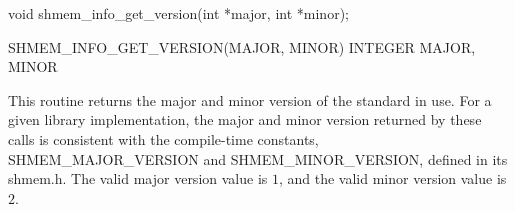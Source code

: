 \synC   %

void shmem_info_get_version(int *major, int *minor); %

\synF   %

SHMEM_INFO_GET_VERSION(MAJOR, MINOR)   
INTEGER MAJOR, MINOR %

{
  This routine returns the major and minor version of the \openshmem{} standard in use.
  For a given library implementation, the major and minor version returned by these calls is consistent with the compile-time constants, SHMEM\_MAJOR\_VERSION and SHMEM\_MINOR\_VERSION, defined in its shmem.h.
  The valid major version value is  $1$, and the valid minor version value is $2$. 
}
{
}
\eAPI

